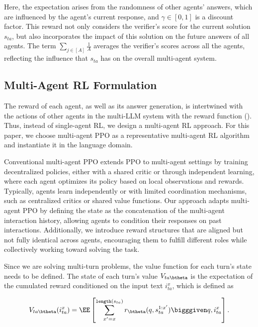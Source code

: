 {Here, the expectation arises from the randomness of other agents' answers, which are influenced by the agent's current response, and \(\gamma \in [0,1]\) is a discount factor.}
This reward not only considers the verifier's score for the current solution \( s_{ta} \), but also incorporates the impact of this solution on the future answers of all agents. The term \( \sum_{j \in [A]} \frac{1}{A} \) averages the verifier's scores across all the agents, reflecting the influence that \( s_{ta} \) has on the overall multi-agent system.



\subsection{Multi-Agent RL Formulation}
The reward of each agent, as well as its answer generation, is intertwined with the actions of other agents in the multi-LLM system with the reward function (). Thus, instead of single-agent RL, we design a multi-agent RL approach. For this paper, we choose multi-agent PPO \citep{yu2022surprising} as a representative multi-agent RL algorithm and instantiate it in the language domain. 

Conventional multi-agent PPO extends PPO to multi-agent settings by training decentralized policies, either with a shared critic or through independent learning, where each agent optimizes its policy based on local observations and rewards. Typically, agents learn independently or with limited coordination mechanisms, such as centralized critics or shared value functions. Our approach adapts multi-agent PPO by defining the state as the concatenation of the multi-agent interaction history, allowing agents to condition their responses on past interactions. Additionally, we introduce reward structures that are aligned but not fully identical across agents, encouraging them to fulfill different roles while collectively working toward solving the task.

Since we are solving multi-turn problems, the value function for each turn's state {needs to be defined}. The state of each turn's  value $V_{ta\btheta}$ is the expectation of the cumulated reward  conditioned on the input text $i_{ta}^x$, which is defined as 

\safevspace{-6mm}
{\small
\begin{align*}
    V_{ta\btheta}(i_{ta}^x) = \EE \left[\sum_{x' = x}^{\texttt{length}(s_{ta})} r_{\btheta} (q, s_{ta}^{1:x'}) \bigggiven q, i_{ta}^{x} \right].
\end{align*}}
\safevspace{-5mm}

